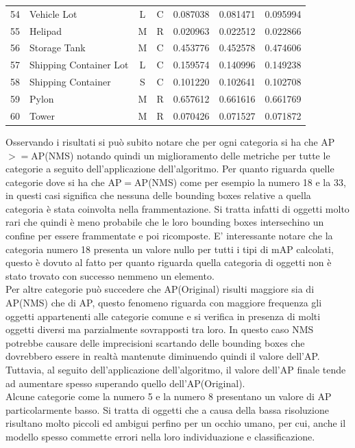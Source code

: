 \begin{center}
\begin{longtable}{|c|l|c|c|c|c|c|}
54 & Vehicle Lot & L & C & 0.087038 & 0.081471 & 0.095994\\
55 & Helipad & M & R & 0.020963 & 0.022512 & 0.022866\\
56 & Storage Tank & M & C & 0.453776 & 0.452578 & 0.474606\\
57 & Shipping Container Lot & L & C & 0.159574 & 0.140996 & 0.149238\\
58 & Shipping Container & S & C & 0.101220 & 0.102641 & 0.102708\\
59 & Pylon & M & R & 0.657612 & 0.661616 & 0.661769\\
60 & Tower & M & R & 0.070426 & 0.071527 & 0.071872\\
\end{longtable}
\end{center}

Osservando i risultati si può subito notare che per ogni categoria si ha che AP$>=$AP(NMS) notando quindi un miglioramento delle metriche per tutte le categorie a seguito dell'applicazione dell'algoritmo. Per quanto riguarda quelle categorie dove si ha che AP$=$AP(NMS) come per esempio la numero 18 e la 33, in questi casi significa che nessuna delle bounding boxes relative a quella categoria è stata coinvolta nella frammentazione. Si tratta infatti di oggetti molto rari che quindi è meno probabile che le loro bounding boxes intersechino un confine per essere frammentate e poi ricomposte. E' interessante notare che la categoria numero 18 presenta un valore nullo per tutti i tipi di mAP calcolati, questo è dovuto al fatto per quanto riguarda quella categoria di oggetti non è stato trovato con successo nemmeno un elemento. \\
Per altre categorie può succedere che AP(Original) risulti maggiore sia di AP(NMS) che di AP, questo fenomeno riguarda con maggiore frequenza gli oggetti appartenenti alle categorie comune e si verifica in presenza di molti oggetti diversi ma parzialmente sovrapposti tra loro. In questo caso NMS potrebbe causare delle imprecisioni scartando delle bounding boxes che dovrebbero essere in realtà mantenute diminuendo quindi il valore dell'AP. Tuttavia, al seguito dell'applicazione dell'algoritmo, il valore dell'AP finale tende ad aumentare spesso superando quello dell'AP(Original).\\
Alcune categorie come la numero 5 e la numero 8 presentano un valore di AP particolarmente basso. Si tratta di oggetti che a causa della bassa risoluzione risultano molto piccoli ed ambigui perfino per un occhio umano, per cui, anche il modello spesso commette errori nella loro individuazione e classificazione.\\

